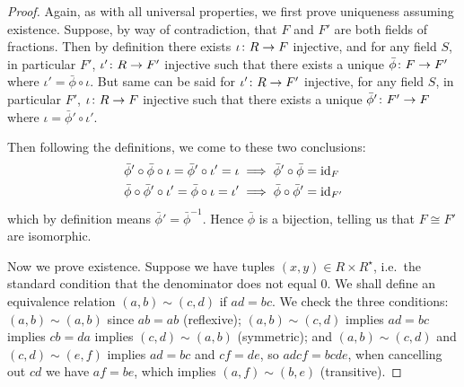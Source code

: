 \begin{proof}
    Again, as with all universal properties,
    we first prove uniqueness assuming existence.
    Suppose, by way of contradiction,
    that \(F\) and \(F'\) are both fields of fractions.
    Then by definition there exists \(\iota\colon R\to F\) injective,
    and for any field \(S\), in particular \(F'\),
    \(\iota'\colon R\to F'\) injective
    such that there exists a unique \(\bar{\phi}\colon F\to F'\)
    where \(\iota' = \bar{\phi}\circ\iota\).
    But same can be said for \(\iota'\colon R\to F'\) injective,
    for any field \(S\), in particular \(F'\),
    \(\iota\colon R\to F\) injective
    such that there exists a unique \(\bar{\phi}'\colon F'\to F\)
    where \(\iota = \bar{\phi}'\circ\iota'\).
    \begin{center}
    \end{center}

    Then following the definitions,
    we come to these two conclusions:
    \begin{align*}
        \bar{\phi}'\circ\bar{\phi}\circ\iota = \bar{\phi}'\circ\iota' = \iota
        &\implies \bar{\phi}'\circ\bar{\phi} = \operatorname{id}_F \\
        \bar{\phi}\circ\bar{\phi}'\circ\iota' = \bar{\phi}\circ\iota = \iota'
        &\implies \bar{\phi}\circ\bar{\phi}' = \operatorname{id}_{F'}
    \end{align*}
    which by definition means \(\bar{\phi}' = \bar{\phi}^{-1}\).
    Hence \(\bar{\phi}\) is a bijection,
    telling us that \(F \cong F'\) are isomorphic.

    Now we prove existence.
    Suppose we have tuples \((x,y) \in R \times R^\star\),
    i.e.\ the standard condition that the denominator does not equal 0.
    We shall define an equivalence relation
    \((a,b) \sim (c,d)\) if \(ad = bc\).
    We check the three conditions:
    \((a,b) \sim (a,b)\) since \(ab = ab\) (reflexive);
    \((a,b) \sim (c,d)\) implies \(ad = bc\)
    implies \(cb = da\) implies \((c,d) \sim (a,b)\) (symmetric);
    and \((a,b) \sim (c,d)\) and \((c,d) \sim (e,f)\)
    implies \(ad = bc\) and \(cf = de\),
    so \(adcf = bcde\), when cancelling out \(cd\) we have \(af = be\),
    which implies \((a,f) \sim (b,e)\) (transitive).


\end{proof}
